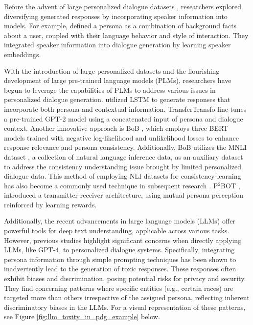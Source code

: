 Before the advent of large personalized dialogue datasets \cite{zhang-etal-2018-personalizing}, researchers explored diversifying generated responses by incorporating speaker information into models. For example, \cite{li-etal-2016-persona} \cite{alrfou-etal-2016-conversational} defined a persona as a combination of background facts about a user, coupled with their language behavior and style of interaction. They integrated speaker information into dialogue generation by learning speaker embeddings.

With the introduction of large personalized datasets and the flourishing development of large pre-trained language models (PLMs), researchers have begun to leverage the capabilities of PLMs to address various issues in personalized dialogue generation. \cite{zhang-etal-2018-personalizing} utilized LSTM to generate responses that incorporate both persona and contextual information. TransferTransfo \cite{wolf-etal-2019-trans} fine-tunes a pre-trained GPT-2 model using a concatenated input of persona and dialogue context. Another innovative approach is BoB \cite{song-etal-2021-bob}, which employs three BERT models trained with negative log-likelihood and unlikelihood losses to enhance response relevance and persona consistency. Additionally, BoB utilizes the MNLI dataset \cite{williams-etal-2018-broad}, a collection of natural language inference data, as an auxiliary dataset to address the consistency understanding issue brought by limited personalized dialogue data. This method of employing NLI datasets for consistency-learning has also become a commonly used technique in subsequent research \cite{chen-etal-2023-memorize}. P$^2$BOT \cite{liu-etal-2020-impress}, introduced a transmitter-receiver architecture, using mutual persona perception reinforced by learning rewards.

Additionally, the recent advancements in large language models (LLMs) offer powerful tools for deep text understanding, applicable across various tasks. However, previous studies \cite{deshpande-etal-2023-toxicity} highlight significant concerns when directly applying LLMs, like GPT-4, to personalized dialogue systems. Specifically, integrating persona information through simple prompting techniques has been shown to inadvertently lead to the generation of toxic responses. These responses often exhibit biases and discrimination, posing potential risks for privacy and security. They find concerning patterns where specific entities (e.g., certain races) are targeted more than others irrespective of the assigned persona, reflecting inherent discriminatory biases in the LLMs. For a visual representation of these patterns, see Figure \ref{fig:llm_toxity_in_pdg_example} below.

